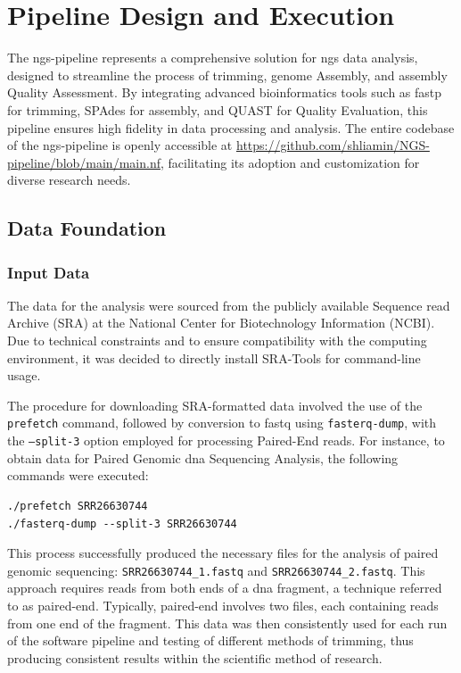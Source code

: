 \chapter{Pipeline Design and Execution}

The \gls{ngs}-pipeline represents a comprehensive solution for \gls{ngs} data analysis, designed to streamline the process of \gls{trimming}, \gls{genome} Assembly, and \gls{assembly} Quality Assessment. By integrating advanced bioinformatics tools such as fastp for \gls{trimming}, SPAdes for \gls{assembly}, and QUAST for Quality Evaluation, this pipeline ensures high fidelity in data processing and analysis. The entire codebase of the \gls{ngs}-pipeline is openly accessible at \url{https://github.com/shliamin/NGS-pipeline/blob/main/main.nf}, facilitating its adoption and customization for diverse research needs.

\section{Data Foundation}

\subsection{Input Data}
The data for the analysis were sourced from the publicly available Sequence \gls{read} Archive (SRA) at the National Center for Biotechnology Information (NCBI). Due to technical constraints and to ensure compatibility with the computing environment, it was decided to directly install SRA-Tools for command-line usage.

The procedure for downloading SRA-formatted data involved the use of the \texttt{prefetch} command, followed by conversion to \gls{fastq} using \texttt{fasterq-dump}, with the \texttt{--split-3} option employed for processing Paired-End \gls{read}s. For instance, to obtain data for Paired Genomic \gls{dna} Sequencing Analysis, the following commands were executed:
\begin{verbatim}
./prefetch SRR26630744
./fasterq-dump --split-3 SRR26630744
\end{verbatim}

This process successfully produced the necessary files for the analysis of paired genomic \gls{sequencing}: \texttt{SRR26630744\_1.fastq} and \texttt{SRR26630744\_2.fastq}. This approach requires \gls{read}s from both ends of a \gls{dna} fragment, a technique referred to as \gls{paired-end}. Typically, \gls{paired-end} involves two files, each containing \gls{read}s from one end of the fragment. This data was then consistently used for each run of the software pipeline and testing of different methods of \gls{trimming}, thus producing consistent results within the scientific method of research.


